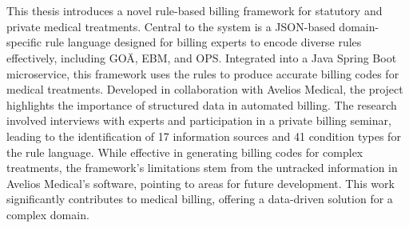 \chapter{\abstractname}

This thesis introduces a novel rule-based billing framework for statutory and private medical treatments.
Central to the system is a JSON-based domain-specific rule language designed for billing experts to encode diverse rules effectively, including GOÄ, EBM, and OPS.
Integrated into a Java Spring Boot microservice, this framework uses the rules to produce accurate billing codes for medical treatments.
Developed in collaboration with Avelios Medical, the project highlights the importance of structured data in automated billing.
The research involved interviews with experts and participation in a private billing seminar, leading to the identification of 17 information sources and 41 condition types for the rule language.
While effective in generating billing codes for complex treatments, the framework's limitations stem from the untracked information in Avelios Medical's software, pointing to areas for future development.
This work significantly contributes to medical billing, offering a data-driven solution for a complex domain.
